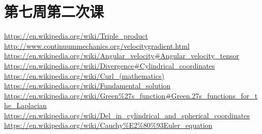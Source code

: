\documentclass{article}
\numberwithin{equation}{section}
\begin{document}
\section{第七周第二次课}

\begin{thebibliography}{99}
 \href{https://en.wikipedia.org/wiki/Triple_product}{https://en.wikipedia.org/wiki/Triple\_product}
\href{http://www.continuummechanics.org/velocitygradient.html}{http://www.continuummechanics.org/velocitygradient.html}
\href{https://en.wikipedia.org/wiki/Angular_velocity#Angular_velocity_tensor}{https://en.wikipedia.org/wiki/Angular\_velocity\#Angular\_velocity\_tensor}
\href{https://en.wikipedia.org/wiki/Divergence#Cylindrical_coordinates}{https://en.wikipedia.org/wiki/Divergence\#Cylindrical\_coordinates}
\href{https://en.wikipedia.org/wiki/Curl_(mathematics)}{https://en.wikipedia.org/wiki/Curl\_(mathematics)}
\href{https://en.wikipedia.org/wiki/Fundamental_solution}{https://en.wikipedia.org/wiki/Fundamental\_solution}
\href{https://en.wikipedia.org/wiki/Green\%27s_function#Green.27s_functions_for_the_Laplacian}{https://en.wikipedia.org/wiki/Green\%27s\_function\#Green.27s\_functions\_for\_the\_Laplacian}
\href{https://en.wikipedia.org/wiki/Del_in_cylindrical_and_spherical_coordinates}{https://en.wikipedia.org/wiki/Del\_in\_cylindrical\_and\_spherical\_coordinates}
\href{https://en.wikipedia.org/wiki/Cauchy\%E2\%80\%93Euler_equation}{https://en.wikipedia.org/wiki/Cauchy\%E2\%80\%93Euler\_equation}
\end{thebibliography}
\printglossaries
\end{document}

